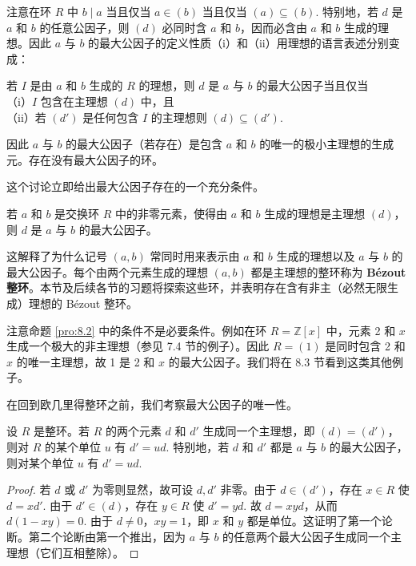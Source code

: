 注意在环 \(R\) 中 \(b \mid a\) 当且仅当 \(a \in (b)\) 当且仅当 \((a) \subseteq (b)\). 特别地，若 \(d\) 是 \(a\) 和 \(b\) 的任意公因子，则 \((d)\) 必同时含 \(a\) 和 \(b\)，因而必含由 \(a\) 和 \(b\) 生成的理想。因此 \(a\) 与 \(b\) 的最大公因子的定义性质（i）和（ii）用理想的语言表述分别变成：
\begin{center}
若 \(I\) 是由 \(a\) 和 \(b\) 生成的 \(R\) 的理想，则 \(d\) 是 \(a\) 与 \(b\) 的最大公因子当且仅当\\
（i）\(I\) 包含在主理想 \((d)\) 中，且\\
（ii）若 \((d')\) 是任何包含 \(I\) 的主理想则 \((d) \subseteq (d')\).
\end{center}
因此 \(a\) 与 \(b\) 的最大公因子（若存在）是包含 \(a\) 和 \(b\) 的唯一的极小主理想的生成元。存在没有最大公因子的环。

这个讨论立即给出最大公因子存在的一个充分条件。

\begin{proposition}\label{pro:8.2}
若 \(a\) 和 \(b\) 是交换环 \(R\) 中的非零元素，使得由 \(a\) 和 \(b\) 生成的理想是主理想 \((d)\)，则 \(d\) 是 \(a\) 与 \(b\) 的最大公因子。
\end{proposition}

这解释了为什么记号 \((a, b)\) 常同时用来表示由 \(a\) 和 \(b\) 生成的理想以及 \(a\) 与 \(b\) 的最大公因子。每个由两个元素生成的理想 \((a, b)\) 都是主理想的整环称为 \textbf{Bézout 整环}。本节及后续各节的习题将探索这些环，并表明存在含有非主（必然无限生成）理想的 Bézout 整环。

注意命题 \ref{pro:8.2} 中的条件不是必要条件。例如在环 \(R = \mathbb{Z}[x]\) 中，元素 2 和 \(x\) 生成一个极大的非主理想（参见 7.4 节的例子）。因此 \(R = (1)\) 是同时包含 2 和 \(x\) 的唯一主理想，故 1 是 2 和 \(x\) 的最大公因子。我们将在 8.3 节看到这类其他例子。

在回到欧几里得整环之前，我们考察最大公因子的唯一性。

\begin{proposition}\label{pro:8.3}
设 \(R\) 是整环。若 \(R\) 的两个元素 \(d\) 和 \(d'\) 生成同一个主理想，即 \((d) = (d')\)，则对 \(R\) 的某个单位 \(u\) 有 \(d' = ud\). 特别地，若 \(d\) 和 \(d'\) 都是 \(a\) 与 \(b\) 的最大公因子，则对某个单位 \(u\) 有 \(d' = ud\).
\end{proposition}

\begin{proof}
若 \(d\) 或 \(d'\) 为零则显然，故可设 \(d, d'\) 非零。由于 \(d \in (d')\)，存在 \(x \in R\) 使 \(d = xd'\). 由于 \(d' \in (d)\)，存在 \(y \in R\) 使 \(d' = yd\). 故 \(d = xyd\)，从而 \(d(1-xy) = 0\). 由于 \(d \neq 0\)，\(xy = 1\)，即 \(x\) 和 \(y\) 都是单位。这证明了第一个论断。第二个论断由第一个推出，因为 \(a\) 与 \(b\) 的任意两个最大公因子生成同一个主理想（它们互相整除）。
\end{proof}

